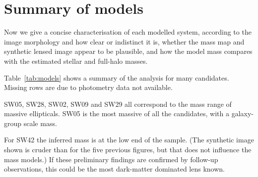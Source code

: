 \section{Summary of models}

Now we give a concise characterisation of each modelled system,
according to the image morphology and how clear or indistinct it is,
whether the mass map and synthetic lensed image appear to be
plausible, and how the model mass compares with the estimated stellar
and full-halo masses.

Table~\ref{tab:models} shows a summary of the analysis for many candidates.
Missing rows are due to photometry data not available.

SW05, SW28, SW02, SW09 and SW29 all correspond to the mass range of
massive ellipticals.  SW05 is the most massive of all the candidates,
with a galaxy-group scale mass.

For SW42 the inferred mass is at the low end of the sample.  (The
synthetic image shown is cruder than for the five previous figures,
but that does not influence the mass models.)  If these preliminary
findings are confirmed by follow-up observations, this could be the
most dark-matter dominated lens known.

